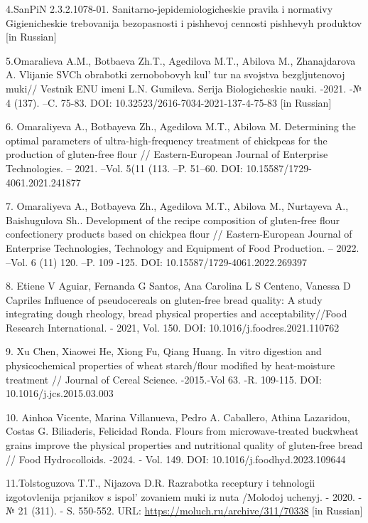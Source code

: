 4.SanPiN 2.3.2.1078-01. Sanitarno-jepidemiologicheskie pravila i
normativy Gigienicheskie trebovanija bezopasnosti i pishhevoj cennosti
pishhevyh produktov {[}in Russian{]}

5.Omaralieva A.M., Botbaeva Zh.T., Agedilova M.T., Abilova M.,
Zhanajdarova A. Vlijanie SVCh obrabotki zernobobovyh
kul' tur na svojstva bezgljutenovoj muki// Vestnik ENU
imeni L.N. Gumileva. Serija Biologicheskie nauki. -2021. -№ 4 (137).
--C. 75-83. DOI: 10.32523/2616-7034-2021-137-4-75-83 {[}in Russian{]}

6. Omaraliyeva A., Botbayeva Zh., Agedilova M.T., Abilova M. Determining
the optimal parameters of ultra-high-frequency treatment of chickpeas
for the production of gluten-free flour // Eastern-European Journal of
Enterprise Technologies. -- 2021. --Vol. 5(11 (113. --P. 51--60. DOI:
10.15587/1729-4061.2021.241877

7. Omaraliyeva A., Botbayeva Zh., Agedilova M.T., Abilova M., Nurtayeva
A., Baishugulova Sh.. Development of the recipe composition of
gluten-free flour confectionery products based on chickpea flour //
Eastern-European Journal of Enterprise Technologies, Technology and
Equipment of Food Production. -- 2022. --Vol. 6 (11) 120. --P. 109 -125.
DOI: 10.15587/1729-4061.2022.269397

8. Etiene V Aguiar, Fernanda G Santos, Ana Carolina L S Centeno, Vanessa
D Capriles Influence of pseudocereals on gluten-free bread quality: A
study integrating dough rheology, bread physical properties and
acceptability//Food Research International. - 2021, Vol. 150. DOI:
10.1016/j.foodres.2021.110762

9. Xu Chen, Xiaowei He, Xiong Fu, Qiang Huang. In vitro digestion and
physicochemical properties of wheat starch/flour modified by
heat-moisture treatment // Journal of Cereal Science. -2015.-Vol 63. -R.
109-115. DOI: 10.1016/j.jcs.2015.03.003

10. Ainhoa Vicente, Marina Villanueva, Pedro A. Caballero, Athina
Lazaridou, Costas G. Biliaderis, Felicidad Ronda. Flours from
microwave-treated buckwheat grains improve the physical properties and
nutritional quality of gluten-free bread // Food Hydrocolloids. -2024. -
Vol. 149. DOI: 10.1016/j.foodhyd.2023.109644

11.Tolstoguzova T.T., Nijazova D.R. Razrabotka receptury i tehnologii
izgotovlenija prjanikov s ispol' zovaniem muki iz nuta
/Molodoj uchenyj. - 2020. -№ 21 (311). - S. 550-552. URL:
\url{https://moluch.ru/archive/311/70338} {[}in Russian{]}

